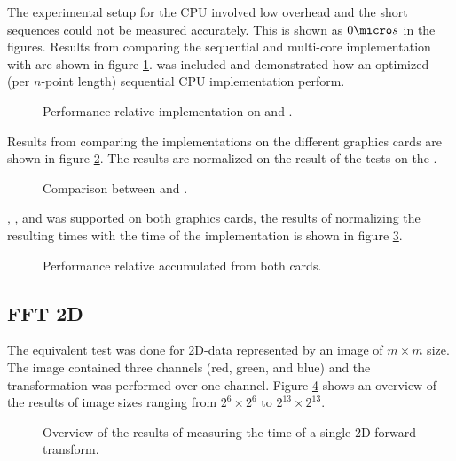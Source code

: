 The experimental setup for the CPU involved low overhead and the short sequences could not be measured accurately. This is shown as $0{\micro}s$ in the figures. Results from comparing the sequential {\CPP} and multi-core {\OMP} implementation with {\CU} are shown in figure \ref{fig:gtx:cpu}. {\FFTW} was included and demonstrated how an optimized (per $n$-point length) sequential CPU implementation perform.

\begin{figure}
	\centering
	
	\caption{Performance relative {\CU} implementation on {\NVCARD} and {\INTELCPU}.}
	\label{fig:gtx:cpu}
\end{figure}

Results from comparing the implementations on the different graphics cards are shown in figure \ref{fig:gpu-comparison}. The results are normalized on the result of the tests on the {\NVCARD}.

\begin{figure}
	\centering
	
	\caption{Comparison between {\AMDCARD} and {\NVCARD}.}
	\label{fig:gpu-comparison}
\end{figure}

{\DX}, {\GL}, and {\OCL} was supported on both graphics cards, the results of normalizing the resulting times with the time of the {\OCL} implementation is shown in figure \ref{fig:gpu-comparison-tech}.

\begin{figure}
	\centering
	
	\caption{Performance relative {\OCL} accumulated from both cards.}
	\label{fig:gpu-comparison-tech}
\end{figure}


\newpage

\subsection{FFT 2D}

The equivalent test was done for \gls{2D}-data represented by an image of $m{\times}m$ size. The image contained three channels (red, green, and blue) and the transformation was performed over one channel. Figure \ref{fig:gpu:overview-2d} shows an overview of the results of image sizes ranging from $2^{6}{\times}2^{6}$ to $2^{13}{\times}2^{13}$.

\begin{figure}
	\centering
	\subfloat[\NVCARD]{	
		
	}
	\vfill
	\subfloat[\AMDCARD]{
		
	}
	\caption{Overview of the results of measuring the time of a single 2D forward transform.}
	\label{fig:gpu:overview-2d}
\end{figure}

